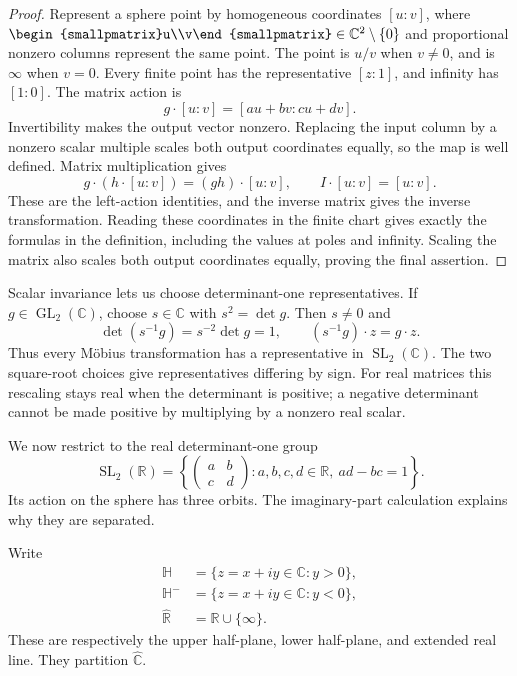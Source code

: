 \begin{proof}
Represent a sphere point by homogeneous coordinates $[u:v]$, where $\begin{smallpmatrix}u\\v\end{smallpmatrix}\in\mathbb C^2\setminus\{0\}$ and proportional nonzero columns represent the same point. The point is $u/v$ when $v\ne0$, and is $\infty$ when $v=0$. Every finite point has the representative $[z:1]$, and infinity has $[1:0]$. The matrix action is
\[
 g\cdot[u:v]=[au+bv:cu+dv].
\]
Invertibility makes the output vector nonzero. Replacing the input column by a nonzero scalar multiple scales both output coordinates equally, so the map is well defined. Matrix multiplication gives
\[
 g\cdot(h\cdot[u:v])=(gh)\cdot[u:v],\qquad I\cdot[u:v]=[u:v].
\]
These are the left-action identities, and the inverse matrix gives the inverse transformation. Reading these coordinates in the finite chart gives exactly the formulas in the definition, including the values at poles and infinity. Scaling the matrix also scales both output coordinates equally, proving the final assertion.
\end{proof}

\label{hyperbolic.scalar-normalization}
Scalar invariance lets us choose determinant-one representatives. If $g\in\operatorname{GL}_2(\mathbb C)$, choose $s\in\mathbb C$ with $s^2=\det g$. Then $s\ne0$ and
\[
 \det(s^{-1}g)=s^{-2}\det g=1,\qquad
 (s^{-1}g)\cdot z=g\cdot z.
\]
Thus every Möbius transformation has a representative in $\operatorname{SL}_2(\mathbb C)$. The two square-root choices give representatives differing by sign. For real matrices this rescaling stays real when the determinant is positive; a negative determinant cannot be made positive by multiplying by a nonzero real scalar.

\label{hyperbolic.real-group}
We now restrict to the real determinant-one group
\[
 \operatorname{SL}_2(\mathbb R)
   =\left\{\begin{pmatrix}a&b\\c&d\end{pmatrix}:a,b,c,d\in\mathbb R,\ ad-bc=1\right\}.
\]
Its action on the sphere has three orbits. The imaginary-part calculation explains why they are separated.

\begin{definition}\label{hyperbolic.half-plane}
Write
\[
 \begin{aligned}
 \mathbb H&=\{z=x+iy\in\mathbb C:y>0\},\\
 \mathbb H^-&=\{z=x+iy\in\mathbb C:y<0\},\\
 \widehat{\mathbb R}&=\mathbb R\cup\{\infty\}.
 \end{aligned}
\]
These are respectively the upper half-plane, lower half-plane, and extended real line. They partition $\widehat{\mathbb C}$.
\end{definition}

